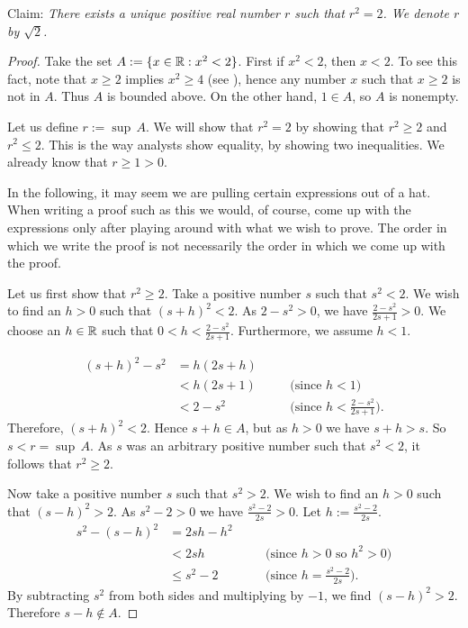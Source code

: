 \begin{example} \label{example:sqrt2}
Claim: \emph{There exists a unique positive
real number $r$ such that $r^2 = 2$.  We denote $r$ by $\sqrt{2}$.}

\begin{proof}
Take the set
$A := \{ x \in {\mathbb{R}} : x^2 < 2 \}$.  First if $x^2 < 2$,
then $x < 2$.  To see this fact, note that $x \geq 2$ implies $x^2 \geq 4$
(see ),
hence any number $x$ such that $x \geq 2$
is not in $A$.  Thus $A$ is bounded above.
On the other hand, $1 \in A$, so $A$ is nonempty.

Let us define $r := \sup\, A$.  We will show that $r^2 = 2$ by showing
that $r^2 \geq 2$ and $r^2 \leq 2$.  This is the way analysts show
equality, by showing two inequalities.
We already know that $r \geq 1 > 0$.

In the following, it may seem we are pulling certain expressions out of
a hat.  When writing a proof such as this we would, of course, come up with
the expressions only after playing around with what we wish to prove.  The
order in which we write the proof is not necessarily the order in which we
come up with the proof.

Let us first show that $r^2 \geq 2$.
Take a positive number $s$ such that $s^2 < 2$.  We wish to find an $h > 0$
such that ${(s+h)}^2 < 2$.
As $2-s^2 > 0$, we have $\frac{2-s^2}{2s+1} > 0$.
We choose an $h \in {\mathbb{R}}$ such that
$0 < h < \frac{2-s^2}{2s+1}$.
Furthermore, we assume $h < 1$.

\begin{equation*}
\begin{aligned}
{(s+h)}^2 - s^2 & = h(2s + h) \\
 & < h(2s+1) & & \quad \bigl(\text{since } h < 1\bigr) \\
 & < 2-s^2 & & \quad \bigl(\text{since } h < \tfrac{2-s^2}{2s+1} \bigr) .
\end{aligned}
\end{equation*}
Therefore, ${(s+h)}^2 < 2$.  Hence $s+h \in A$, but as $h > 0$
we have $s+h > s$.  So $s < r = \sup\, A$.  As $s$ was an arbitrary
positive number such that $s^2 < 2$, it follows that $r^2 \geq 2$.


Now take a positive number $s$ such that
$s^2 > 2$.  We wish to find an $h > 0$ such that
${(s-h)}^2 > 2$.
As 
$s^2-2 > 0$ we have $\frac{s^2-2}{2s} > 0$.
Let $h := \frac{s^2-2}{2s}$.
\begin{equation*}
\begin{aligned}
s^2 - {(s-h)}^2 & = 2sh - h^2 \\
 & < 2sh & & \quad \bigl( \text{since $h > 0$ so $h^2 > 0$} \bigr)  \\
 & \leq s^2-2 & & \quad \bigl( \text{since } h = \tfrac{s^2-2}{2s} \bigr) .
\end{aligned}
\end{equation*}
By subtracting $s^2$ from both sides and multiplying by $-1$, we find
${(s-h)}^2 > 2$.  Therefore $s-h \notin A$.


\end{proof}
\end{example}

